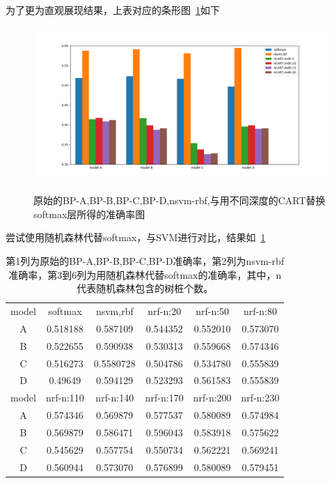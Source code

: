 为了更为直观展现结果，上表对应的条形图~\ref{fig:bpx2}如下
\begin{figure}[htb]
\centering
\includegraphics[scale=0.5]{../figures/NN_tree1.png} \\
\caption{原始的BP-A,BP-B,BP-C,BP-D,nsvm-rbf,与用不同深度的CART替换softmax层所得的准确率图}
\label{fig:bpx2}
\end{figure}


尝试使用随机森林代替softmax，与SVM进行对比，结果如~\ref{table:bpx5}

\begin{table}[htb]
\centering
\caption{第1列为原始的BP-A,BP-B,BP-C,BP-D准确率，第2列为nsvm-rbf准确率，第3到6列为用随机森林代替softmax的准确率，其中，n代表随机森林包含的树桩个数。}
\begin{tabular}{cccccc}
\toprule[2pt]
model & softmax & nsvm,rbf & nrf-n:20 & nrf-n:50 & nrf-n:80 \\ 
A & 0.518188 & 0.587109 & 0.544352 & 0.552010 & 0.573070 \\ 
B & 0.522655 & 0.590938 & 0.530313 & 0.559668 & 0.574346 \\ 
C & 0.516273 & 0.5580728 & 0.504786 & 0.534780 & 0.555839 \\  
D & 0.49649 & 0.594129 & 0.523293 & 0.561583 & 0.555839 \\ 
\midrule[2pt]
model & nrf-n:110 & nrf-n:140 & nrf-n:170 & nrf-n:200 & nrf-n:230 \\ 
A & 0.574346 & 0.569879 & 0.577537 & 0.580089 & 0.574984 \\ 
B & 0.569879 & 0.586471 & 0.596043 & 0.583918 & 0.575622 \\ 
C & 0.545629 & 0.557754 & 0.550734 & 0.562221 & 0.569241 \\ 
D & 0.560944 & 0.573070 & 0.576899 & 0.580089 & 0.579451 \\ 
\bottomrule[2pt]
\end{tabular} 
\label{table:bpx5}
\end{table}


